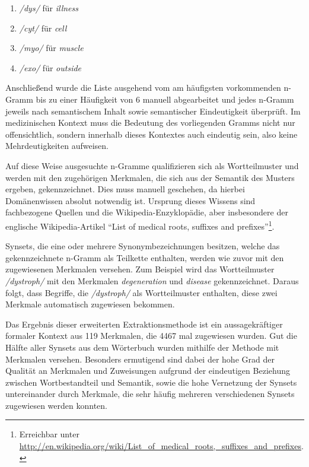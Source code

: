\documentclass[pagesize,paper=A4,DIV=calc,fontsize=12pt,draft=false]{scrreprt}
\begin{document}
\begin{multicols}{2}
\begin{enumerate}
    \item \textit{/dys/} für \textit{illness}
    \item \textit{/cyt/} für \textit{cell}
    \item \textit{/myo/} für \textit{muscle}
    \item \textit{/exo/} für \textit{outside}
\end{enumerate}
\end{multicols}

Anschließend wurde die Liste ausgehend vom am häufigsten vorkommenden n-Gramm bis zu einer Häufigkeit von 6 manuell abgearbeitet und jedes n-Gramm jeweils nach semantischem Inhalt sowie semantischer Eindeutigkeit überprüft.
Im medizinischen Kontext muss die Bedeutung des vorliegenden Gramms nicht nur offensichtlich, sondern innerhalb dieses Kontextes auch eindeutig sein, also keine Mehrdeutigkeiten aufweisen. 

Auf diese Weise ausgesuchte n-Gramme qualifizieren sich als Wortteilmuster und werden mit den zugehörigen Merkmalen, die sich aus der Semantik des Musters ergeben, gekennzeichnet. 
Dies muss manuell geschehen, da hierbei Domänenwissen absolut notwendig ist. 
Ursprung dieses Wissens sind fachbezogene Quellen und die Wikipedia-Enzyklopädie, aber insbesondere der englische Wikipedia-Artikel \enquote{List of medical roots, suffixes and prefixes}\footnote{Erreichbar unter \href{http://en.wikipedia.org/wiki/List\_of\_medical\_roots,\_suffixes\_and\_prefixes}{http://en.wikipedia.org/wiki/List\_of\_medical\_roots,\_suffixes\_and\_prefixes}.}. 

Synsets, die eine oder mehrere Synonymbezeichnungen besitzen, welche das gekennzeichnete n-Gramm als Teilkette enthalten, werden wie zuvor mit den zugewiesenen Merkmalen versehen. 
Zum Beispiel wird das Wortteilmuster \emph{/dystroph/} mit den Merkmalen \textit{degeneration} und \textit{disease} gekennzeichnet. 
Daraus folgt, dass Begriffe, die \emph{/dystroph/} als Wortteilmuster enthalten, diese zwei Merkmale automatisch zugewiesen bekommen. 

Das Ergebnis dieser erweiterten Extraktionsmethode ist ein aussagekräftiger formaler Kontext aus 119 Merkmalen, die 4467 mal zugewiesen wurden. 
Gut die Hälfte aller Synsets aus dem Wörterbuch wurden mithilfe der Methode mit Merkmalen versehen. 
Besonders ermutigend sind dabei der hohe Grad der Qualität an Merkmalen und Zuweisungen aufgrund der eindeutigen Beziehung zwischen Wortbestandteil und Semantik, sowie die hohe Vernetzung der Synsets untereinander durch Merkmale, die sehr häufig mehreren verschiedenen Synsets zugewiesen werden konnten. 
\end{document}
